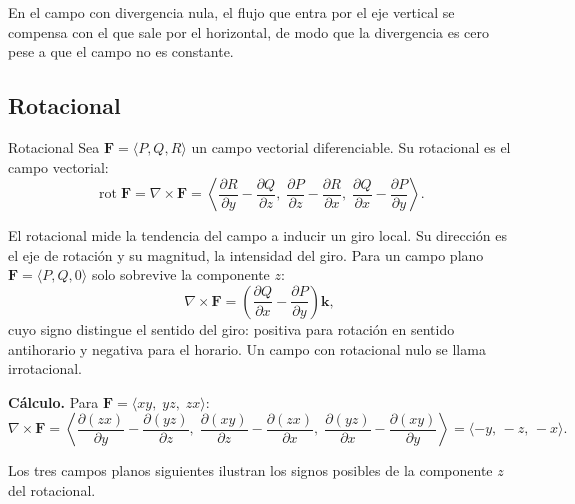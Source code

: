 En el campo con divergencia nula, el flujo que entra por el eje vertical se compensa con el que sale por el horizontal, de modo que la divergencia es cero pese a que el campo no es constante.

\subsection{Rotacional}

\begin{mydefinition}{Rotacional}
Sea $\mathbf{F} = \langle P, Q, R \rangle$ un campo vectorial diferenciable. Su rotacional es el campo vectorial:
\[
\operatorname{rot} \mathbf{F} = \nabla \times \mathbf{F}
= \left\langle
\frac{\partial R}{\partial y} - \frac{\partial Q}{\partial z},\;
\frac{\partial P}{\partial z} - \frac{\partial R}{\partial x},\;
\frac{\partial Q}{\partial x} - \frac{\partial P}{\partial y}
\right\rangle.
\]
\end{mydefinition}

El rotacional mide la tendencia del campo a inducir un giro local. Su dirección es el eje de rotación y su magnitud, la intensidad del giro. Para un campo plano $\mathbf{F} = \langle P, Q, 0 \rangle$ solo sobrevive la componente $z$:
\[
\nabla \times \mathbf{F} = \left( \frac{\partial Q}{\partial x} - \frac{\partial P}{\partial y} \right) \mathbf{k},
\]
cuyo signo distingue el sentido del giro: positiva para rotación en sentido antihorario y negativa para el horario. Un campo con rotacional nulo se llama irrotacional.

\textbf{Cálculo.} Para $\mathbf{F} = \langle xy,\; yz,\; zx \rangle$:
\[
\nabla \times \mathbf{F}
= \left\langle
\frac{\partial(zx)}{\partial y} - \frac{\partial(yz)}{\partial z},\;
\frac{\partial(xy)}{\partial z} - \frac{\partial(zx)}{\partial x},\;
\frac{\partial(yz)}{\partial x} - \frac{\partial(xy)}{\partial y}
\right\rangle
= \langle -y,\, -z,\, -x \rangle.
\]

Los tres campos planos siguientes ilustran los signos posibles de la componente $z$ del rotacional.

